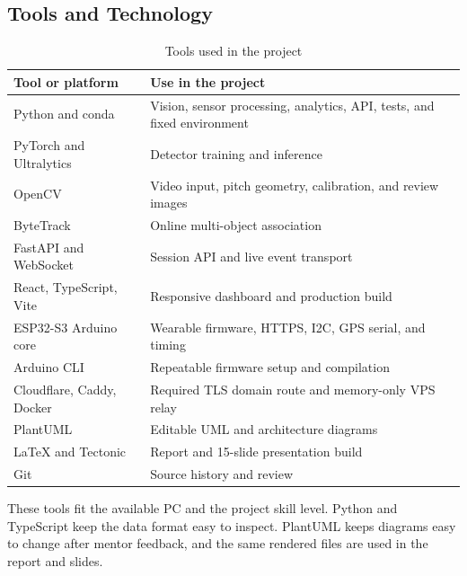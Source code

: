\subsection{Tools and Technology}
\begin{table}[H]
\centering
\caption{Tools used in the project}
\label{tab:tools}
\small
\begin{tabularx}{\textwidth}{p{1.65in}X}
\toprule
\textbf{Tool or platform} & \textbf{Use in the project}\\
\midrule
Python and conda & Vision, sensor processing, analytics, API, tests, and fixed environment\\
PyTorch and Ultralytics & Detector training and inference\\
OpenCV & Video input, pitch geometry, calibration, and review images\\
ByteTrack & Online multi-object association\\
FastAPI and WebSocket & Session API and live event transport\\
React, TypeScript, Vite & Responsive dashboard and production build\\
ESP32-S3 Arduino core & Wearable firmware, HTTPS, I2C, GPS serial, and timing\\
Arduino CLI & Repeatable firmware setup and compilation\\
Cloudflare, Caddy, Docker & Required TLS domain route and memory-only VPS relay\\
PlantUML & Editable UML and architecture diagrams\\
LaTeX and Tectonic & Report and 15-slide presentation build\\
Git & Source history and review\\
\bottomrule
\end{tabularx}
\end{table}

These tools fit the available PC and the project skill level. Python and
TypeScript keep the data format easy to inspect. PlantUML keeps diagrams easy to
change after mentor feedback, and the same rendered files are used in the
report and slides.

